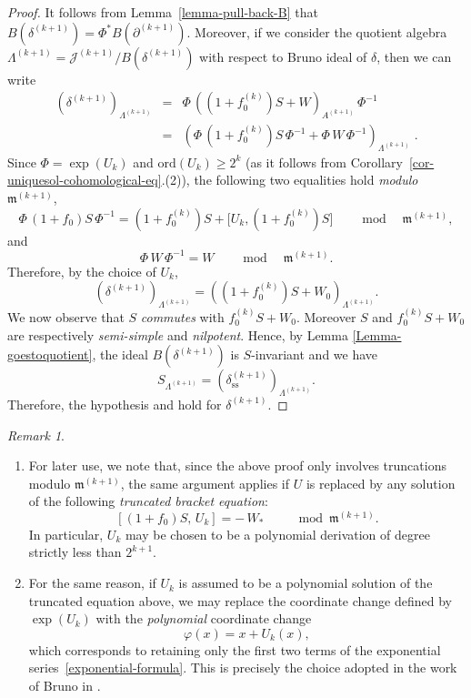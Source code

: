 \documentclass[10pt,twoside,reqno]{amsart}
\theoremstyle{remark}
\theoremstyle{remark}
\newtheorem{remark}[thm]{Remark}
\newcommand{\tmem}[1]{{\em #1\/}}
\newcommand{\tmop}[1]{{\operatorname{#1}}}
\newcommand{\tmtextbf}[1]{\text{{\bfseries{#1}}}}
\newcommand{\ord}{\mathrm{ord}}
\begin{document}
\begin{proof}
  It follows from Lemma~\ref{lemma-pull-back-B} that $B (\delta^{(k + 1)}) =
  \Phi^{\ast} B (\partial^{(k + 1)})$. Moreover, if we consider the quotient
  algebra ${\Lambda}^{(k + 1)} = \mathcal{J}^{(k + 1)} / B (\delta^{(k + 1)})$ with respect to Bruno ideal of $\delta$,  then we can
  write
  \begin{eqnarray*}
    (\delta^{(k + 1)})_{{\Lambda}^{(k + 1)}} & = & \Phi\, ((1 + f_0^{(k)}) S + W)_{A^{(k + 1)}}\, \Phi^{- 1}\\
    & = & (\Phi\, (1 + f_0^{(k)}) S\, \Phi^{- 1} + \Phi\, W\, \Phi^{-
    1})_{{\Lambda}^{(k + 1)}} \; .
  \end{eqnarray*}
  Since $\Phi = \exp (U_k)$ and $\ord(U_k) \ge 2^k$ (as it follows from Corollary~\ref{cor-uniquesol-cohomological-eq}.(2)), the following
  two equalities hold {\tmem{modulo $\mathfrak{m}^{(k + 1)}$}}, \
  \[ \Phi\, (1 + f_0) S\, \Phi^{- 1} = (1 + f_0^{(k)}) S + \big[ U_k, (1 +
     f_0^{(k)}) S \big] \qquad \tmop{mod} \quad \mathfrak{m}^{(k + 1)}, \]
  and
  \[ \Phi\, W\, \Phi^{- 1} = W \qquad \tmop{mod} \quad
     \mathfrak{m}^{(k + 1)}.\]
  Therefore, by the choice of $U_k$,
  \[ (\delta^{(k + 1)})_{{\Lambda}^{(k + 1)}} = ((1 + f_0^{(k)}) S + W_0)_{{\Lambda}^{(k + 1)}}. \]
  We now observe that $S$ {\em commutes} with $f_0^{(k)} S + W_0$. Moreover $S$ and $f_0^{(k)} S + W_0$ are respectively
  {\em semi-simple} and {\em nilpotent}. Hence, by Lemma \ref{Lemma-goestoquotient}, the
  ideal $B (\delta^{(k + 1)})$ is $S$-invariant and we have
  \[ S_{{\Lambda}^{(k + 1)}} = (\delta^{(k + 1)}_{\tmop{ss}})_{{\Lambda}^{(k + 1)}}. \]
  Therefore, the hypothesis \tmtextbf{$(H_{k + 1}^{(1)})$} and \tmtextbf{$(H_{k +
  1}^{(2)})$} hold for $\delta^{(k + 1)}$. 
\end{proof}
\begin{remark}\label{remark-truncated-bracket-equation}
\begin{enumerate}
    \item For later use, we note that, since the above proof only involves truncations
modulo \( \mathfrak{m}^{(k+1)} \), the same argument applies if \(U\) is replaced
by any solution of the following \emph{truncated bracket equation}:
\[
[(1+f_0)S,\, U_k] = -\,W_{\ast}
\qquad \mod \mathfrak{m}^{(k+1)}.
\]
In particular, \(U _k \) may be chosen to be a polynomial derivation of degree
strictly less than \(2^{k+1}\).  
\item  For the same reason, if \(U_k \) is assumed to be a polynomial solution of the
truncated equation above, we may replace the coordinate change defined by
\(\exp(U_k)\) with the {\em polynomial} coordinate change
\[
\varphi(x) = x + U_k(x),
\]
which corresponds to retaining only the first two terms of the exponential
series~\eqref{exponential-formula}. This is precisely the choice adopted in the
work of Bruno in \cite{Bruno1971_1972}.
\end{enumerate}
 
\end{remark}
\end{document}
